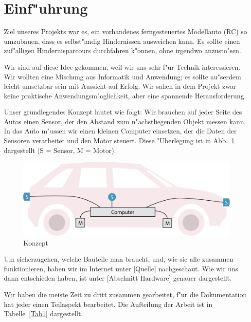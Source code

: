 \documentclass[a4paper,12pt]{article}
\begin{document}
\newpage


\tableofcontents

\newpage


\section{Einf"uhrung}\label{sec1}

Ziel unseres Projekts war es, ein vorhandenes ferngesteuertes Modellauto (RC) so umzubauen, dass es selbst"andig Hindernissen ausweichen kann.
Es sollte einen zuf"alligen Hindernisparcours durchfahren k"onnen, ohne irgendwo anzusto"sen.

Wir sind auf diese Idee gekommen, weil wir uns sehr f"ur Technik interessieren.
Wir wollten eine Mischung aus Informatik und Anwendung; es sollte au"serdem leicht umsetzbar sein mit Aussicht auf Erfolg.
Wir sahen in dem Projekt zwar keine praktische Anwendungsm"oglichkeit, aber eine spannende Herausforderung.

Unser grundlegendes Konzept lautet wie folgt:
Wir brauchen auf jeder Seite des Autos einen Sensor, der den Abstand zum n"achstliegenden Objekt messen kann.
In das Auto m"ussen wir einen kleinen Computer einsetzen, der die Daten der Sensoren verarbeitet und den Motor steuert.
Diese "Uberlegung ist in Abb.~\ref{Fig1} dargestellt (S = Sensor, M = Motor).

\begin{figure}[h]
	\centering
	\includegraphics[width=12cm]{./media/overview.png}
	\caption{Konzept}
	\label{Fig1}
\end{figure}

Um sicherzugehen, welche Bauteile man braucht, und, wie sie alle zusammen funktionieren, haben wir im Internet unter [Quelle] nachgeschaut.
Wie wir uns dann entschieden haben, ist unter [Abschnitt Hardware] genauer dargestellt.

Wir haben die meiste Zeit zu dritt zusammen gearbeitet, f"ur die Dokumentation hat jeder einen Teilaspekt bearbeitet.
Die Aufteilung der Arbeit ist in Tabelle~\ref{Tab1} dargestellt.
\end{document}
